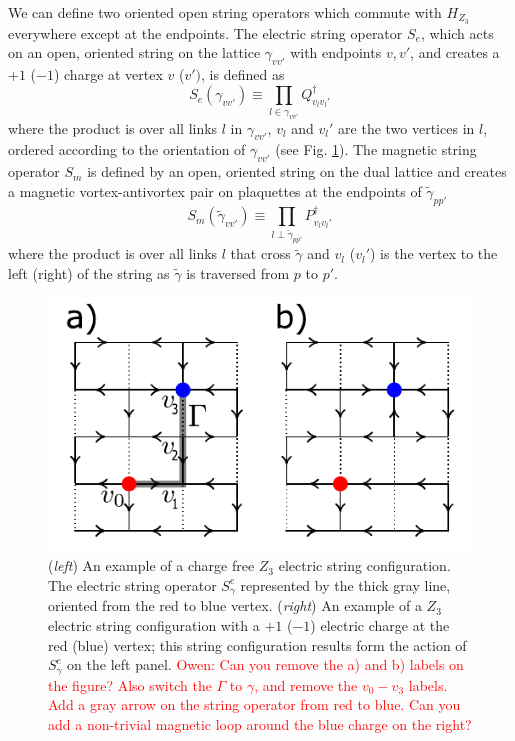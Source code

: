 \documentclass[twocolumn,prb,aps,floatfix,superscriptaddress]{revtex4-1}
\newcommand{\figref}[1]{Fig. \ref{#1}}
\newcommand{\note}[1]{\textcolor{red}{#1}}
\begin{document}
We can define two oriented open string operators which commute with $H_{Z_3}$ everywhere except at the endpoints. The electric string operator $S_e$, which acts on an open, oriented string on the lattice $\gamma_{vv'}$ with endpoints $v,v'$, and creates a $+1$ ($-1$) charge at vertex $v$ ($v')$, is defined as
\begin{equation}
    S_e \left( \gamma_{vv'} \right) \equiv \prod_{l \in \gamma_{vv'}} Q_{v_l v_l'}^\dagger
\end{equation}
where the product is over all links $l$ in $\gamma_{vv'}$, $v_l$ and $v_l'$ are the two vertices in $l$, ordered according to the orientation of $\gamma_{vv'}$ (see \figref{fig:example_elec_string}). The magnetic string operator $S_m$ is defined by an open, oriented string on the dual lattice and creates a magnetic vortex-antivortex pair on plaquettes at the endpoints of $\tilde{\gamma}_{pp'}$
\begin{equation}
    S_m \left( \tilde{\gamma}_{vv'} \right) \equiv \prod_{l \perp \tilde{\gamma}_{pp'}} P_{v_l v_l'}^\dagger
\end{equation}
where the product is over all links $l$ that cross $\tilde{\gamma}$ and $v_l$ ($v_l'$) is the vertex to the left (right) of the string as $\tilde{\gamma}$ is traversed from $p$ to $p'$. 
\begin{figure}[t]
    \centering
    \includegraphics[width=0.8\linewidth]{example_elec_string.pdf}
    \caption{ ({\it left}) An example of a charge free $Z_3$ electric string configuration. The electric string operator $S_\gamma^e$ represented by the thick gray line, oriented from the red to blue vertex. ({\it right}) An example of a $Z_3$ electric string configuration with a $+1$ ($-1$) electric charge at the red (blue) vertex; this string configuration results form the action of $S_\gamma^e$ on the left panel. \note{Owen: Can you remove the a) and b) labels on the figure? Also switch the $\Gamma$ to $\gamma$, and remove the $v_0-v_3$ labels. Add a gray arrow on the string operator from red to blue. Can you add a non-trivial magnetic loop around the blue charge on the right?} }
    \label{fig:example_elec_string}
\end{figure}
\end{document}
